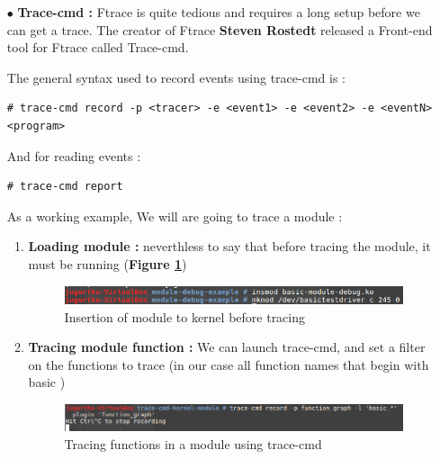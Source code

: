 \begin{itemize}
	\item[$\bullet$] \textbf{Trace-cmd : }
Ftrace is quite tedious and requires a long setup before we can get a trace. The creator of Ftrace \og \textbf{Steven Rostedt} \fg released a Front-end tool for Ftrace called Trace-cmd.	

The general syntax used to record events using trace-cmd is :
	\begin{lstlisting}[style=BashInputStyle]
# trace-cmd record -p <tracer> -e <event1> -e <event2> -e <eventN> <program>
	\end{lstlisting}
	
And for reading events :
	\begin{lstlisting}[style=BashInputStyle]
# trace-cmd report
	\end{lstlisting}	

As a working example, We will are going to trace a module :
\begin{enumerate}
	\item \textbf{Loading module : } neverthless to say that before tracing the module, it must be running (\textbf{Figure \ref{Insertion of module to kernel before tracing}})
		\begin{figure}[H]
			\centering
        	\includegraphics[scale=0.45]{img/solution/insert-your-module-to-kernel.png}
        	\caption{Insertion of module to kernel before tracing}
        	\label{Insertion of module to kernel before tracing}
    	\end{figure}
    		
	\item \textbf{Tracing module function : } We can launch trace-cmd, and set a filter on the functions to trace (in our case all function names that begin with \og basic \fg)
	
		\begin{figure}[H]
			\centering
        	\includegraphics[scale=0.43]{img/solution/trace-cmd-tracing-module.png}
        	\caption{Tracing functions in a module using trace-cmd}
        	\label{Tracing functions in a module using trace-cmd}
    	\end{figure}	
	

\end{enumerate}
\end{itemize}
